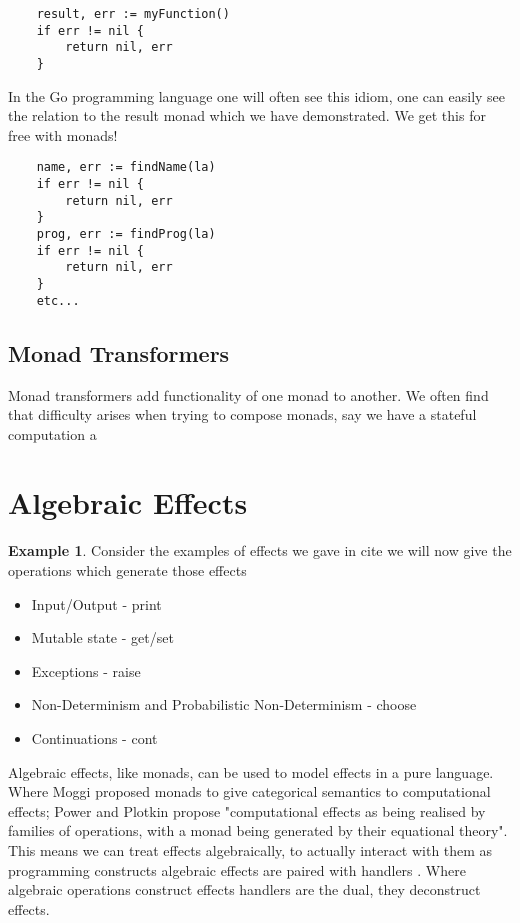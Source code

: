 \documentclass[a4paper,10pt]{article}
\theoremstyle{definition}
\newtheorem{example}{Example}[section]
\begin{document}
\begin{verbatim}
    result, err := myFunction()
    if err != nil {
        return nil, err
    }
\end{verbatim}

In the Go programming language one will often see this idiom,
one can easily see the relation to the result monad which we
have demonstrated.
We get this for free with monads!

\begin{verbatim}
    name, err := findName(la)
    if err != nil {
        return nil, err
    }
    prog, err := findProg(la)
    if err != nil {
        return nil, err
    }
    etc...
\end{verbatim}


\subsection{Monad Transformers}
Monad transformers add functionality of one monad to another.
We often find that difficulty arises when trying to compose monads,
say we have a stateful computation a



\section{Algebraic Effects}

\begin{example}
    Consider the examples of effects we gave in cite
    we will now give the operations which generate those effects
    \begin{itemize}
        \item Input/Output - print
        \item Mutable state - get/set
        \item Exceptions - raise
        \item Non-Determinism and Probabilistic Non-Determinism - choose
        \item Continuations - cont
    \end{itemize}
\end{example}
Algebraic effects, like monads, can be used to model effects in a pure language.
Where Moggi \cite{moggi1989computational} proposed monads to give categorical semantics to computational effects;
Power and Plotkin \cite{Plotkin:2002dw} propose "computational effects as being realised by
families of operations, with a monad being generated by their equational theory".
This means we can treat effects algebraically,
to actually interact with them as programming constructs algebraic effects are paired with
handlers \cite{plotkin2009handlers}.
Where algebraic operations construct effects handlers are the dual, they deconstruct effects.
\end{document}
